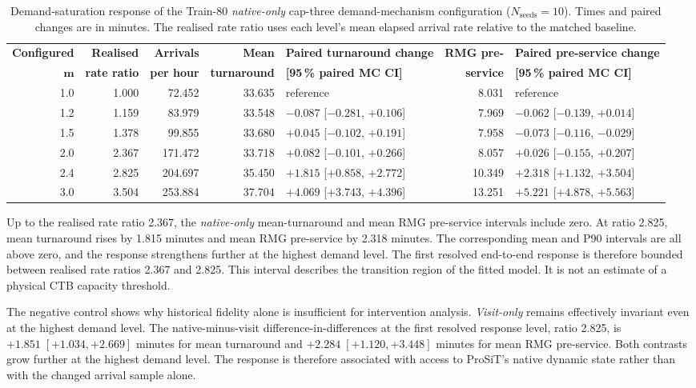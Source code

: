 \begin{table}[htbp]
\centering
\scriptsize
\setlength{\tabcolsep}{2.8pt}
\begin{tabularx}{\textwidth}{@{}rrrrXrX@{}}
\toprule
\textbf{Configured} & \textbf{Realised} & \textbf{Arrivals} & \textbf{Mean} & \textbf{Paired turnaround change} & \textbf{RMG pre-} & \textbf{Paired pre-service change} \\
$\boldsymbol{m}$ & \textbf{rate ratio} & \textbf{per hour} & \textbf{turnaround} & \textbf{[95\,\% paired MC CI]} & \textbf{service} & \textbf{[95\,\% paired MC CI]} \\
\midrule
1.0 & 1.000 & 72.452  & 33.635 & reference & 8.031  & reference \\
1.2 & 1.159 & 83.979  & 33.548 & $-0.087$ [$-0.281$, $+0.106$] & 7.969  & $-0.062$ [$-0.139$, $+0.014$] \\
1.5 & 1.378 & 99.855  & 33.680 & $+0.045$ [$-0.102$, $+0.191$] & 7.958  & $-0.073$ [$-0.116$, $-0.029$] \\
2.0 & 2.367 & 171.472 & 33.718 & $+0.082$ [$-0.101$, $+0.266$] & 8.057  & $+0.026$ [$-0.155$, $+0.207$] \\
2.4 & 2.825 & 204.697 & 35.450 & $+1.815$ [$+0.858$, $+2.772$] & 10.349 & $+2.318$ [$+1.132$, $+3.504$] \\
3.0 & 3.504 & 253.884 & 37.704 & $+4.069$ [$+3.743$, $+4.396$] & 13.251 & $+5.221$ [$+4.878$, $+5.563$] \\
\bottomrule
\end{tabularx}
\caption{Demand-saturation response of the Train-80 \textit{native-only}
 cap-three demand-mechanism configuration ($N_{\mathrm{seeds}}=10$). Times and paired
changes are in minutes. The realised rate ratio uses each level's mean elapsed
arrival rate relative to the matched baseline.}
\label{tab:demand_saturation_ladder}
\end{table}

Up to the realised rate ratio 2.367, the \textit{native-only} mean-turnaround
and mean RMG pre-service intervals include zero. At ratio 2.825, mean
turnaround rises by 1.815 minutes and mean RMG pre-service by 2.318 minutes.
The corresponding mean and P90 intervals are all above zero, and the response
strengthens further at the highest demand level. The first resolved end-to-end
response is therefore bounded between realised rate ratios 2.367 and 2.825.
This interval describes the transition region of the fitted model. It is not
an estimate of a physical CTB capacity threshold.

The negative control shows why historical fidelity alone is insufficient for
intervention analysis.
\textit{Visit-only} remains effectively invariant even at the highest demand
level. The native-minus-visit difference-in-differences at the first resolved
response level, ratio 2.825, is
$+1.851\;[+1.034,+2.669]$ minutes for mean turnaround and
$+2.284\;[+1.120,+3.448]$ minutes for mean RMG pre-service. Both contrasts grow
further at the highest demand level. The response is therefore associated with
access to ProSiT's native dynamic state rather than with the changed arrival
sample alone.

